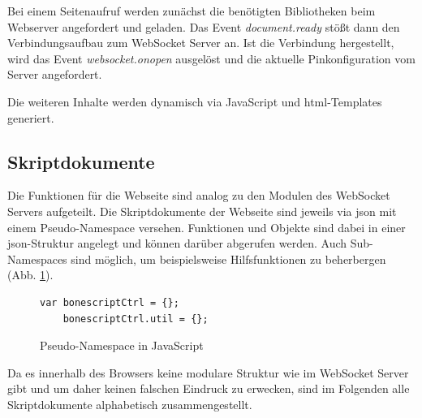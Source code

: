 Bei einem Seitenaufruf werden zunächst die benötigten Bibliotheken beim Webserver angefordert und geladen. Das Event \textit{document.ready} stößt dann den Verbindungsaufbau zum WebSocket Server an. Ist die Verbindung hergestellt, wird das Event \textit{websocket.onopen} ausgelöst und die aktuelle Pinkonfiguration vom Server angefordert.

Die weiteren Inhalte werden dynamisch via JavaScript und \gls{html}-Templates generiert.


\subsection{Skriptdokumente}
Die Funktionen für die Webseite sind analog zu den Modulen des WebSocket Servers aufgeteilt. Die Skriptdokumente der Webseite sind jeweils via \gls{json} mit einem Pseudo-Namespace versehen. Funktionen und Objekte sind dabei in einer \gls{json}-Struktur angelegt und können darüber abgerufen werden. Auch Sub-Namespaces sind möglich, um beispielsweise Hilfsfunktionen zu beherbergen (Abb. \ref{lst:pseudeNamespaceJS}).

\begin{figure}[ht]
\begin{lstlisting}
var bonescriptCtrl = {};
    bonescriptCtrl.util = {};
\end{lstlisting}
\caption{Pseudo-Namespace in JavaScript}
\label{lst:pseudeNamespaceJS}
\end{figure}

Da es innerhalb des Browsers keine modulare Struktur wie im WebSocket Server gibt und um daher keinen falschen Eindruck zu erwecken, sind im Folgenden alle Skriptdokumente alphabetisch zusammengestellt.

